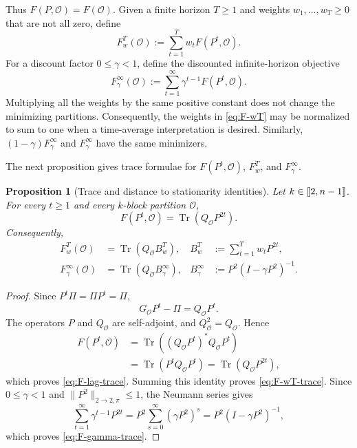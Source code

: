 \documentclass[11pt]{article}
\newtheorem{proposition}[theorem]{Proposition}
\newcommand{\1}{\mathbf{1}}
\providecommand{\llbracket}{\mathopen{[\mkern-2.7mu[}}
\providecommand{\rrbracket}{\mathclose{]\mkern-2.7mu]}}
\begin{document}
Thus $F(P,\mathcal O)=F(\mathcal O)$.  Given a finite horizon
$T\geq1$ and weights $w_1,\ldots,w_T\geq0$ that are not all zero,
define
\begin{equation}
    F_w^T(\mathcal O)
    :=\sum_{t=1}^T w_t F(P^t,\mathcal O).
    \label{eq:F-wT}
\end{equation}
For a discount factor $0\leq\gamma<1$, define the discounted
infinite-horizon objective
\begin{equation}
    F_\gamma^\infty(\mathcal O)
    :=\sum_{t=1}^\infty
      \gamma^{t-1}F(P^t,\mathcal O).
    \label{eq:F-gamma-infinity}
\end{equation}
Multiplying all the weights by the same positive constant does not
change the minimizing partitions.  Consequently, the weights in
\eqref{eq:F-wT} may be normalized to sum to one when a time-average
interpretation is desired.  Similarly, $(1-\gamma)F_\gamma^\infty$
and $F_\gamma^\infty$ have the same minimizers.

The next proposition gives trace formulae for
$F(P^t,\mathcal O)$, $F_w^T$, and $F_\gamma^\infty$.

\begin{proposition}[Trace and distance to stationarity identities]
\label{prop:multi-horizon-identities}
Let $k\in\llbracket 2,n-1\rrbracket$.
For every $t\geq1$ and every $k$-block partition $\mathcal O$,
\begin{equation}
    F(P^t,\mathcal O)
    =\operatorname{Tr}(Q_{\mathcal O}P^{2t}).
    \label{eq:F-lag-trace}
\end{equation}
Consequently,
\begin{align}
    F_w^T(\mathcal O)
    &=\operatorname{Tr}(Q_{\mathcal O}B_w^T),
    &
    B_w^T&:=\sum_{t=1}^T w_tP^{2t},
    \label{eq:F-wT-trace}\\
    F_\gamma^\infty(\mathcal O)
    &=\operatorname{Tr}(Q_{\mathcal O}B_\gamma^\infty),
    &
    B_\gamma^\infty
    &:=P^2(I-\gamma P^2)^{-1}.
    \label{eq:F-gamma-trace}
\end{align}

\end{proposition}

\begin{proof}
Since $P^t\Pi=\Pi P^t=\Pi$,
\[
    G_{\mathcal O}P^t-\Pi=Q_{\mathcal O}P^t.
\]
The operators $P$ and $Q_{\mathcal O}$ are self-adjoint, and
$Q_{\mathcal O}^2=Q_{\mathcal O}$.  Hence
\[
\begin{split}
    F(P^t,\mathcal O)
    &=\operatorname{Tr}\left(
       (Q_{\mathcal O}P^t)^*Q_{\mathcal O}P^t
      \right)\\
    &=\operatorname{Tr}(P^tQ_{\mathcal O}P^t)
     =\operatorname{Tr}(Q_{\mathcal O}P^{2t}),
\end{split}
\]
which proves \eqref{eq:F-lag-trace}.  Summing this identity proves
\eqref{eq:F-wT-trace}.  Since $0\leq\gamma<1$ and
$\|P^2\|_{2\to2,\pi}\leq1$, the Neumann series gives
\[
    \sum_{t=1}^\infty\gamma^{t-1}P^{2t}
    =P^2\sum_{s=0}^\infty(\gamma P^2)^s
    =P^2(I-\gamma P^2)^{-1},
\]
which proves \eqref{eq:F-gamma-trace}.
\end{proof}
\end{document}
